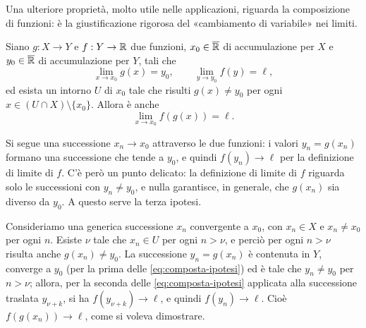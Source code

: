 Una ulteriore proprietà, molto utile nelle applicazioni, riguarda la composizione di
funzioni: è la giustificazione rigorosa del «cambiamento di variabile» nei limiti.

\begin{teorema}\label{teo:limite-composta}
Siano $g:X\to Y$ e $f:Y\to\mathbb{R}$ due funzioni, $x_{0}\in\overline{\mathbb{R}}$ di accumulazione per
$X$ e $y_{0}\in\overline{\mathbb{R}}$ di accumulazione per $Y$, tali che
\begin{equation}\label{eq:composta-ipotesi}
  \lim_{x\to x_{0}}g(x)=y_{0}, \qquad \lim_{y\to y_{0}}f(y)=\ell,
\end{equation}
ed esista un intorno $U$ di $x_{0}$ tale che risulti $g(x)\neq y_{0}$ per ogni
$x\in(U\cap X)\setminus\{x_{0}\}$. Allora è anche
\begin{equation}\label{eq:composta-tesi}
  \lim_{x\to x_{0}}f(g(x))=\ell .
\end{equation}
\end{teorema}

\begin{schema}
\end{schema}

\begin{strategia}
Si segue una successione $x_{n}\to x_{0}$ attraverso le due funzioni: i valori
$y_{n}=g(x_{n})$ formano una successione che tende a $y_{0}$, e quindi $f(y_{n})\to\ell$
per la definizione di limite di $f$. C'è però un punto delicato: la definizione di
limite di $f$ riguarda solo le successioni con $y_{n}\neq y_{0}$, e nulla garantisce,
in generale, che $g(x_{n})$ sia diverso da $y_{0}$. A questo serve la terza ipotesi.
\end{strategia}

\begin{dimostrazione}
Consideriamo una generica successione $x_{n}$ convergente a $x_{0}$, con $x_{n}\in X$ e
$x_{n}\neq x_{0}$ per ogni $n$. Esiste $\nu$ tale che $x_{n}\in U$ per ogni $n>\nu$, e
perciò per ogni $n>\nu$ risulta anche $g(x_{n})\neq y_{0}$. La successione
$y_{n}=g(x_{n})$ è contenuta in $Y$, converge a $y_{0}$ (per la prima delle
\eqref{eq:composta-ipotesi}) ed è tale che $y_{n}\neq y_{0}$ per $n>\nu$; allora, per la
seconda delle \eqref{eq:composta-ipotesi} applicata alla successione traslata
$y_{\nu+k}$, si ha $f(y_{\nu+k})\to\ell$, e quindi $f(y_{n})\to\ell$. Cioè
$f(g(x_{n}))\to\ell$, come si voleva dimostrare.
\end{dimostrazione}

